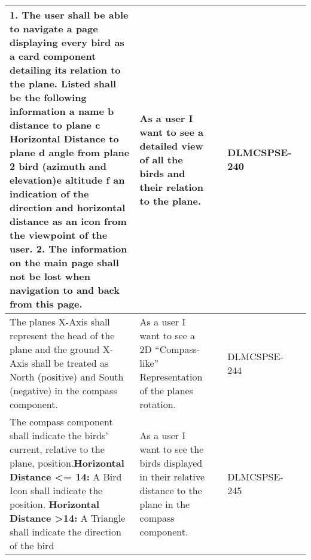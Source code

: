 \begin{xltabular}{\textwidth}{|X|X|M{1.8cm}|M{1.3cm}|M{1.3cm}|}
  \textbf{1.} The user shall be able to navigate a page displaying every bird as a card component detailing its relation to the plane. Listed shall be the following information \newline \textbf{a} name \newline \textbf{b} distance to plane \newline \textbf{c} Horizontal Distance to plane \newline \textbf{d} angle from plane 2 bird (azimuth and elevation)\newline \textbf{e} altitude \newline \textbf{f} an indication of the direction and horizontal distance as an icon from the viewpoint of the user. \newline \newline \textbf{2.} The information on the main page shall not be lost when navigation to and back from this page. & As a user I want to see a detailed view of all the birds and their relation to the plane. &  & {\color{purpleT}\ttfamily DLMCSPSE-240} &  \\ \hline 
  The planes X-Axis shall represent the head of the plane and the ground X-Axis shall be treated as North (positive) and South (negative) in the compass component. & As a user I want to see a 2D “Compass-like” Representation of the planes rotation. &  & {\color{purpleT}\ttfamily DLMCSPSE-244} &  \\ \hline 
  The compass component shall indicate the birds' current, relative to the plane, position.\newline \textbf{Horizontal Distance \textless = 14:} \newline A Bird Icon shall indicate the position. \newline \newline \textbf{Horizontal Distance \textgreater 14:} \newline A Triangle shall indicate the direction of the bird & As a user I want to see the birds displayed in their relative distance to the plane in the compass component. &  & {\color{purpleT}\ttfamily DLMCSPSE-245} &  \\ \hline 

\end{xltabular}
